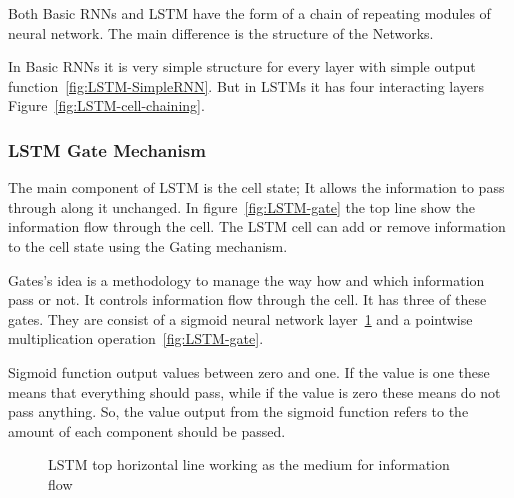  Both Basic RNNs and LSTM have the form of a chain of repeating modules of neural network. The main difference is the structure of the Networks.
 



In Basic RNNs it is very simple structure for every layer with simple output function~\ref{fig:LSTM-SimpleRNN}. But in LSTMs it has four interacting layers Figure~\ref{fig:LSTM-cell-chaining}. 




\subsubsection{LSTM Gate Mechanism}

The main component of LSTM is the cell state; It allows the information to pass through along it unchanged. In figure~\ref{fig:LSTM-gate} the top line show the information flow through the cell. The LSTM cell can add or remove information to the cell state using the Gating mechanism. 

Gates's idea is a methodology to manage the way how and which information pass or not. It controls information flow through the cell. It has three of these gates. They are consist of a sigmoid neural network layer~\ref{fig:LSTM-Cell-state} and a pointwise multiplication operation~\ref{fig:LSTM-gate}.

Sigmoid function output values between zero and one. If the value is one these means that everything should pass, while if the value is zero these means do not pass anything. So, the value output from the sigmoid function refers to the amount of each component should be passed.

      \begin{figure}[ht!]
    \centering

        \caption{LSTM top horizontal line working as the medium for information flow~\cite{colah}}
      \label{fig:LSTM-Cell-state}
      \end{figure}

